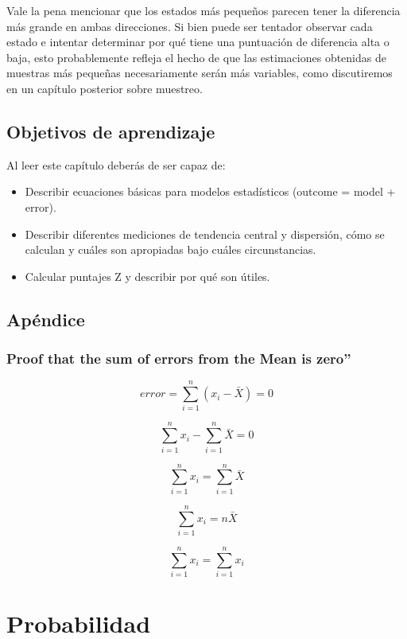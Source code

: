 \documentclass[
  12pt,
]{book}
\providecommand{\tightlist}{%
  \setlength{\itemsep}{0pt}\setlength{\parskip}{0pt}}
\begin{document}
Vale la pena mencionar que los estados más pequeños parecen tener la diferencia más grande en ambas direcciones. Si bien puede ser tentador observar cada estado e intentar determinar por qué tiene una puntuación de diferencia alta o baja, esto probablemente refleja el hecho de que las estimaciones obtenidas de muestras más pequeñas necesariamente serán más variables, como discutiremos en un capítulo posterior sobre muestreo.

\hypertarget{objetivos-de-aprendizaje-4}{%
\section{Objetivos de aprendizaje}\label{objetivos-de-aprendizaje-4}}

Al leer este capítulo deberás de ser capaz de:

\begin{itemize}
\tightlist
\item
  Describir ecuaciones básicas para modelos estadísticos (outcome = model + error).
\item
  Describir diferentes mediciones de tendencia central y dispersión, cómo se calculan y cuáles son apropiadas bajo cuáles circunstancias.
\item
  Calcular puntajes Z y describir por qué son útiles.
\end{itemize}

\hypertarget{apuxe9ndice-1}{%
\section{Apéndice}\label{apuxe9ndice-1}}

\hypertarget{proof-that-the-sum-of-errors-from-the-mean-is-zero}{%
\subsection{Proof that the sum of errors from the Mean is zero''}\label{proof-that-the-sum-of-errors-from-the-mean-is-zero}}

\[
error = \sum_{i=1}^{n}(x_i - \bar{X}) = 0
\]

\[
\sum_{i=1}^{n}x_i - \sum_{i=1}^{n}\bar{X}=0
\]

\[
\sum_{i=1}^{n}x_i = \sum_{i=1}^{n}\bar{X}
\]

\[
\sum_{i=1}^{n}x_i = n\bar{X}
\]

\[
\sum_{i=1}^{n}x_i = \sum_{i=1}^{n}x_i
\]

\hypertarget{probability}{%
\chapter{Probabilidad}\label{probability}}
\end{document}
